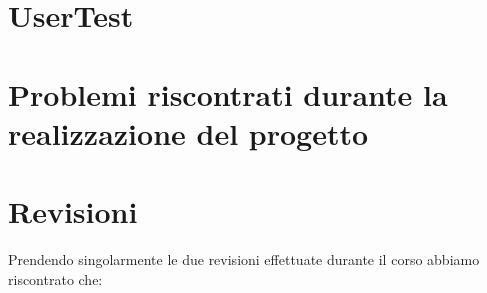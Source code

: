 \documentclass{article}
\begin{document}
\section{UserTest}

\vspace{1cm}

    \vspace{1cm}
    

    \vspace{1cm}
    

    \vspace{1cm}
    
\section{Problemi riscontrati durante la realizzazione del progetto}

\vspace{1cm}


\section{Revisioni}
Prendendo singolarmente le due revisioni effettuate durante il corso abbiamo riscontrato che:
\end{document}
